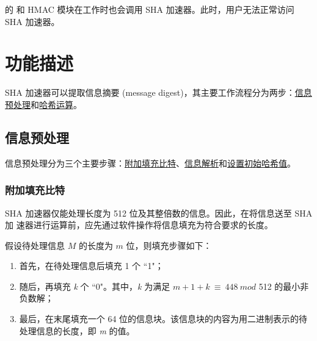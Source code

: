 \documentclass[main\_\_CN.tex]{subfiles}
\begin{document}
\begin{importantlisting}
\vspace{-0.5em}

    \chipname{} 的  和 HMAC 模块在工作时也会调用 SHA 加速器。此时，用户无法正常访问 SHA 加速器。
\end{importantlisting}

\section{功能描述}

SHA 加速器可以提取信息摘要 (message digest)，其主要工作流程分为两步：\hyperref[sec:sha-preprocessing]{信息预处理}和\hyperref[sec:sha-hash-operation]{哈希运算}。

\subsection{信息预处理}\label{sec:sha-preprocessing}

信息预处理分为三个主要步骤：\hyperref[sec:sha-textpadding]{附加填充比特}、\hyperref[sec:sha-parsingmessage]{信息解析}和\hyperref[sec:sha-initialhash]{设置初始哈希值}。

\subsubsection{附加填充比特}\label{sec:sha-textpadding}

SHA 加速器仅能处理长度为 512 位及其整倍数的信息。因此，在将信息送至 SHA 加
速器进行运算前，应先通过软件操作将信息填充为符合要求的长度。

假设待处理信息 \begin{math} M \end{math} 的长度为 \begin{math} m \end{math} 位，则填充步骤如下：

\begin{enumerate}
    \item 首先，在待处理信息后填充 1 个 ``1"；
    \item 随后，再填充 {\it{k}} 个 ``0"。其中，{\it{k}} 为满足 \begin{math}m + 1 + k \ {\equiv} \ 448 \ mod \end{math} 512 的最小非负数解；
    \item 最后，在末尾填充一个 64 位的信息块。该信息块的内容为用二进制表示的待处理信息的长度，即 {\it{m}} 的值。
\end{enumerate}
\end{document}
